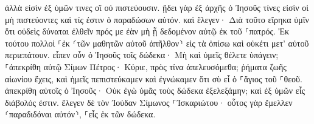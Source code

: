 \documentclass{openreader}
\begin{document}
ἀλλὰ εἰσὶν ἐξ ὑμῶν τινες οἳ οὐ πιστεύουσιν. ᾔδει γὰρ ἐξ ἀρχῆς ὁ Ἰησοῦς τίνες εἰσὶν οἱ μὴ πιστεύοντες καὶ τίς ἐστιν ὁ παραδώσων αὐτόν. 
καὶ ἔλεγεν· Διὰ τοῦτο εἴρηκα ὑμῖν ὅτι οὐδεὶς δύναται ἐλθεῖν πρός με ἐὰν μὴ ᾖ δεδομένον αὐτῷ ἐκ τοῦ ⸀πατρός. 
Ἐκ τούτου πολλοὶ ⸀ἐκ ⸂τῶν μαθητῶν αὐτοῦ ἀπῆλθον⸃ εἰς τὰ ὀπίσω καὶ οὐκέτι μετ’ αὐτοῦ περιεπάτουν. 
εἶπεν οὖν ὁ Ἰησοῦς τοῖς δώδεκα· Μὴ καὶ ὑμεῖς θέλετε ὑπάγειν; 
⸀ἀπεκρίθη αὐτῷ Σίμων Πέτρος· Κύριε, πρὸς τίνα ἀπελευσόμεθα; ῥήματα ζωῆς αἰωνίου ἔχεις, 
καὶ ἡμεῖς πεπιστεύκαμεν καὶ ἐγνώκαμεν ὅτι σὺ εἶ ὁ ⸀ἅγιος τοῦ ⸀θεοῦ. 
ἀπεκρίθη αὐτοῖς ὁ Ἰησοῦς· Οὐκ ἐγὼ ὑμᾶς τοὺς δώδεκα ἐξελεξάμην; καὶ ἐξ ὑμῶν εἷς διάβολός ἐστιν. 
ἔλεγεν δὲ τὸν Ἰούδαν Σίμωνος ⸀Ἰσκαριώτου· οὗτος γὰρ ἔμελλεν ⸂παραδιδόναι αὐτόν⸃, ⸀εἷς ἐκ τῶν δώδεκα. 
\end{document}
